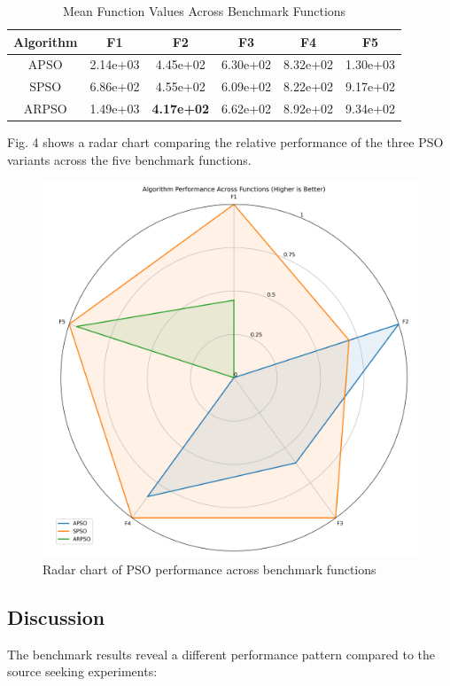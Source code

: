 \documentclass[conference]{IEEEtran}
\begin{document}
\begin{table}[htbp]
\caption{Mean Function Values Across Benchmark Functions}
\begin{center}
\begin{tabular}{|c|c|c|c|c|c|}
\hline
\textbf{Algorithm} & \textbf{F1} & \textbf{F2} & \textbf{F3} & \textbf{F4} & \textbf{F5} \\
\hline
APSO & 2.14e+03 & 4.45e+02 & 6.30e+02 & 8.32e+02 & 1.30e+03 \\
\hline
SPSO & 6.86e+02 & 4.55e+02 & 6.09e+02 & 8.22e+02 & 9.17e+02 \\
\hline
ARPSO & 1.49e+03 & \textbf{4.17e+02} & 6.62e+02 & 8.92e+02 & 9.34e+02 \\
\hline
\end{tabular}
\label{tab:benchmark_results}
\end{center}
\end{table}

Fig. 4 shows a radar chart comparing the relative performance of the three PSO variants across the five benchmark functions.

\begin{figure}[htbp]
\centering
\includegraphics[width=0.7\linewidth]{../plots/cec_bench/radar_chart.png}
\caption{Radar chart of PSO performance across benchmark functions}
\label{fig:radar_chart}
\end{figure}

\subsection{Discussion}
The benchmark results reveal a different performance pattern compared to the source seeking experiments:
\end{document}
